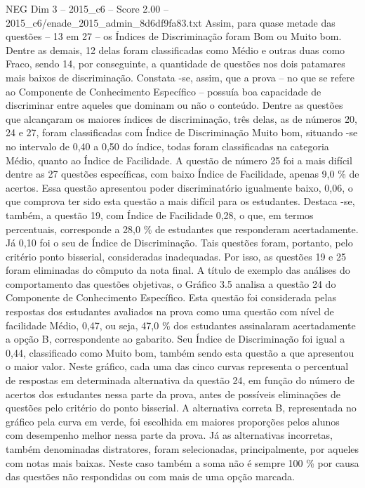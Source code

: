 \begin{textsample}{NEG Dim 3 – 2015\_c6 – Score 2.00 – 2015\_c6/enade\_2015\_admin\_8d6df9fa83.txt}
Assim, para quase metade das questões – 13 em 27 – os Índices de Discriminação foram Bom ou Muito bom.
Dentre as demais, 12 delas foram classificadas como Médio e outras duas como Fraco, sendo 14, por conseguinte, a quantidade de questões nos dois patamares mais baixos de discriminação.
Constata -se, assim, que a prova – no que se refere ao Componente de Conhecimento Específico – possuía boa capacidade de discriminar entre aqueles que dominam ou não o conteúdo.
Dentre as questões que alcançaram os maiores índices de discriminação, três delas, as de números 20, 24 e 27, foram classificadas com Índice de Discriminação Muito bom, situando -se no intervalo de 0,40 a 0,50 do índice, todas foram classificadas na categoria Médio, quanto ao Índice de Facilidade.
A questão de número 25 foi a mais difícil dentre as 27 questões específicas, com baixo Índice de Facilidade, apenas 9,0 \% de acertos.
Essa questão apresentou poder discriminatório igualmente baixo, 0,06, o que comprova ter sido esta questão a mais difícil para os estudantes.
Destaca -se, também, a questão 19, com Índice de Facilidade 0,28, o que, em termos percentuais, corresponde a 28,0 \% de estudantes que responderam acertadamente.
Já 0,10 foi o seu de Índice de Discriminação.
Tais questões foram, portanto, pelo critério ponto bisserial, consideradas inadequadas.
Por isso, as questões 19 e 25 foram eliminadas do cômputo da nota final.
A título de exemplo das análises do comportamento das questões objetivas, o Gráfico 3.5 analisa a questão 24 do Componente de Conhecimento Específico.
Esta questão foi considerada pelas respostas dos estudantes avaliados na prova como uma questão com nível de facilidade Médio, 0,47, ou seja, 47,0 \% dos estudantes assinalaram acertadamente a opção B, correspondente ao gabarito.
Seu Índice de Discriminação foi igual a 0,44, classificado como Muito bom, também sendo esta questão a que apresentou o maior valor.
Neste gráfico, cada uma das cinco curvas representa o percentual de respostas em determinada alternativa da questão 24, em função do número de acertos dos estudantes nessa parte da prova, antes de possíveis eliminações de questões pelo critério do ponto bisserial.
A alternativa correta B, representada no gráfico pela curva em verde, foi escolhida em maiores proporções pelos alunos com desempenho melhor nessa parte da prova.
Já as alternativas incorretas, também denominadas distratores, foram selecionadas, principalmente, por aqueles com notas mais baixas.
Neste caso também a soma não é sempre 100 \% por causa das questões não respondidas ou com mais de uma opção marcada.

\end{textsample}
